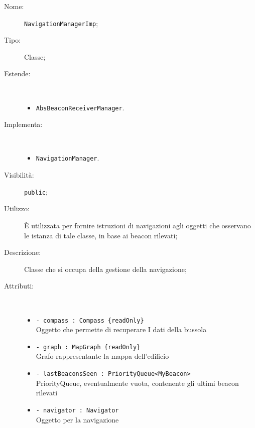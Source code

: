 \documentclass[../DefinizioneDiProdotto.tex]{subfiles}
\begin{document}
\begin{description}
	\item[Nome:] \texttt{NavigationManagerImp};
	\item[Tipo:] Classe;
	\item[Estende:] \
	\begin{itemize}
		\item \texttt{AbsBeaconReceiverManager}.
	\end{itemize}
	\item[Implementa:] \
	\begin{itemize}
		\item \texttt{NavigationManager}.
		
	\end{itemize}
	\item[Visibilità:] \texttt{public};
	\item[Utilizzo:] È utilizzata per fornire istruzioni di navigazioni agli oggetti che osservano le istanza di tale classe, in base ai beacon rilevati;
	\item[Descrizione:] Classe che si occupa della gestione della navigazione;
	\item[Attributi:] \
	\begin{itemize}
		\item \texttt{- compass : Compass \{readOnly\}}\\
		Oggetto che permette di recuperare I dati della bussola
		
		\item \texttt{- graph : MapGraph \{readOnly\}}\\
		Grafo rappresentante la mappa dell'edificio
		
		\item \texttt{- lastBeaconsSeen : PriorityQueue<MyBeacon>}\\
		PriorityQueue, eventualmente vuota, contenente gli ultimi beacon rilevati
		
		\item \texttt{- navigator : Navigator}\\
		Oggetto per la navigazione
		

\end{itemize}
\end{description}
\end{document}
